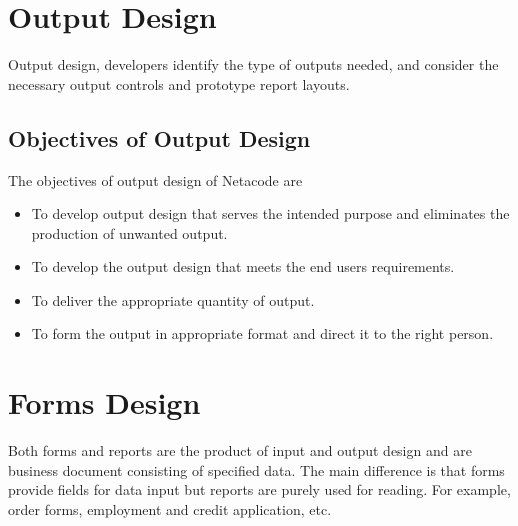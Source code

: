 \documentclass[a4paper,12pt]{report}
\begin{document}
\section{Output Design}
Output design, developers identify the type of outputs needed, and consider the necessary output controls and prototype report layouts.

\subsection{Objectives of Output Design}
The objectives of output  design of Netacode are 
\begin{itemize}
	\item 	To develop output design that serves the intended purpose and eliminates the production of unwanted output.
	\item 	To develop the output design that meets the end users requirements.
	\item 	To deliver the appropriate quantity of output.
	\item 	To form the output in appropriate format and direct it to the right person.
\end{itemize}	
\section{Forms Design}
Both forms and reports are the product of input and output design and are business document consisting of specified data. The main difference is that forms provide fields for data input but reports are purely used for reading. For example, order forms, employment and credit application, etc.
\end{document}
